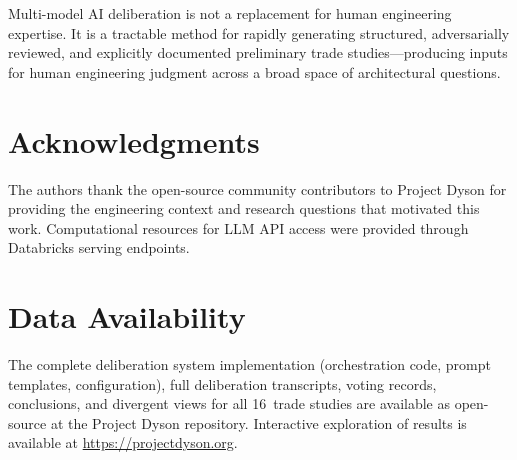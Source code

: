 \documentclass[11pt,a4paper]{article}
\begin{document}
Multi-model AI deliberation is not a replacement for human engineering expertise. It is a tractable method for rapidly generating structured, adversarially reviewed, and explicitly documented preliminary trade studies---producing inputs for human engineering judgment across a broad space of architectural questions.

\section*{Acknowledgments}

The authors thank the open-source community contributors to Project Dyson for providing the engineering context and research questions that motivated this work. Computational resources for LLM API access were provided through Databricks serving endpoints.

\section*{Data Availability}

The complete deliberation system implementation (orchestration code, prompt templates, configuration), full deliberation transcripts, voting records, conclusions, and divergent views for all 16~trade studies are available as open-source at the Project Dyson repository. Interactive exploration of results is available at \url{https://projectdyson.org}.
\end{document}
